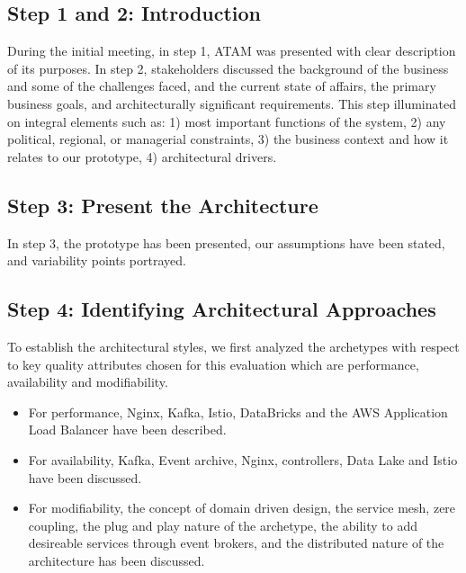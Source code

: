 \documentclass[review]{elsarticle}
\begin{document}
\subsection{Step 1 and 2: Introduction}

During the initial meeting, in step 1, ATAM was presented with clear description of its purposes. In step 2, stakeholders discussed the background of the business and some of the challenges faced, and the current state of affairs, the primary business goals, and architecturally significant requirements. This step illuminated on integral elements such as: 1) most important functions of the system, 2) any political, regional, or managerial constraints, 3) the business context and how it relates to our prototype, 4) architectural drivers.  


\subsection{Step 3: Present the Architecture}

In step 3, the prototype has been presented, our assumptions have been stated, and variability points portrayed. 


\subsection{Step 4: Identifying Architectural Approaches}

To establish the architectural styles, we first analyzed the archetypes with respect to key quality attributes chosen for this evaluation which are performance, availability and modifiability.

\begin{itemize}
    \item For performance, Nginx, Kafka, Istio, DataBricks and the AWS Application Load Balancer have been described.
    \item For availability, Kafka, Event archive, Nginx, controllers, Data Lake and Istio have been discussed.
    \item For modifiability, the concept of domain driven design, the service mesh, zere coupling, the plug and play nature of the archetype, the ability to add desireable services through event brokers, and the distributed nature of the architecture has been discussed.
\end{itemize}
\end{document}
